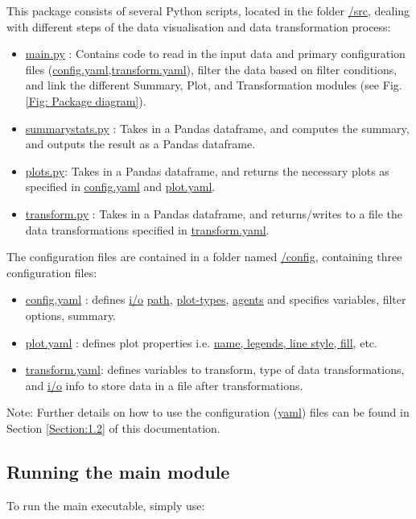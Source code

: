 \documentclass[10pt,a4paper]{article}
\begin{document}
This package consists of several Python scripts, located in the folder \url{/src}, dealing with different steps of the data visualisation and data transformation process:
\begin{itemize}
\item \url{main.py} : Contains code to read in the input data and primary configuration files (\url{config.yaml,transform.yaml}), filter the data based on filter conditions, and link the different Summary, Plot, and Transformation modules (see Fig. \ref{Fig: Package diagram}).

\item \url{summarystats.py} : Takes in a Pandas dataframe, and computes the summary, and outputs the result as a Pandas dataframe.

\item \url{plots.py}: Takes in a Pandas dataframe, and returns the necessary plots as specified in \url{config.yaml} and \url{plot.yaml}.

\item \url{transform.py} : Takes in a Pandas dataframe, and returns/writes to a file the data transformations specified in \url{transform.yaml}.
\end{itemize}

The configuration files are contained in a folder named \url{/config}, containing three configuration files:
\begin{itemize}
\item \url{config.yaml} : defines \url{i/o} \url{path}, \url{plot-types}, \url{agents} and specifies variables, filter options, summary.

\item \url{plot.yaml} : defines plot properties i.e. \url{name, legends, line style, fill}, etc.

\item \url{transform.yaml}: defines variables to transform, type of data transformations, and \url{i/o} info to store data in a file after transformations.
\end{itemize}

Note: Further details on how to use the configuration (\url{yaml}) files can be found in Section \ref{Section:1.2} of this documentation.

\subsection{Running the main module}

To run the main executable, simply use:
\end{document}
